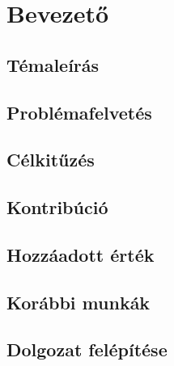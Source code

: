 \chapter{Bevezető} 

\section{Témaleírás}


\section{Problémafelvetés}


\section{Célkitűzés}

\section{Kontribúció}

\section{Hozzáadott érték}

\section{Korábbi munkák}

\section{Dolgozat felépítése}

